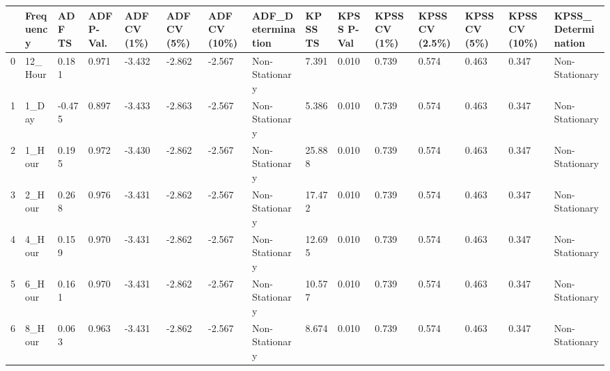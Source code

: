 \begin{tabular}{lllllllllllllll}
\toprule
 & Frequency & ADF TS & ADF P-Val. & ADF CV (1\%) & ADF CV (5\%) & ADF CV (10\%) & ADF_Determination & KPSS TS & KPSS P-Val & KPSS CV (1\%) & KPSS CV (2.5\%) & KPSS CV (5\%) & KPSS CV (10\%) & KPSS_Determination \\
\midrule
0 & 12_Hour & 0.181 & 0.971 & -3.432 & -2.862 & -2.567 & Non-Stationary & 7.391 & 0.010 & 0.739 & 0.574 & 0.463 & 0.347 & Non-Stationary \\
1 & 1_Day & -0.475 & 0.897 & -3.433 & -2.863 & -2.567 & Non-Stationary & 5.386 & 0.010 & 0.739 & 0.574 & 0.463 & 0.347 & Non-Stationary \\
2 & 1_Hour & 0.195 & 0.972 & -3.430 & -2.862 & -2.567 & Non-Stationary & 25.888 & 0.010 & 0.739 & 0.574 & 0.463 & 0.347 & Non-Stationary \\
3 & 2_Hour & 0.268 & 0.976 & -3.431 & -2.862 & -2.567 & Non-Stationary & 17.472 & 0.010 & 0.739 & 0.574 & 0.463 & 0.347 & Non-Stationary \\
4 & 4_Hour & 0.159 & 0.970 & -3.431 & -2.862 & -2.567 & Non-Stationary & 12.695 & 0.010 & 0.739 & 0.574 & 0.463 & 0.347 & Non-Stationary \\
5 & 6_Hour & 0.161 & 0.970 & -3.431 & -2.862 & -2.567 & Non-Stationary & 10.577 & 0.010 & 0.739 & 0.574 & 0.463 & 0.347 & Non-Stationary \\
6 & 8_Hour & 0.063 & 0.963 & -3.431 & -2.862 & -2.567 & Non-Stationary & 8.674 & 0.010 & 0.739 & 0.574 & 0.463 & 0.347 & Non-Stationary \\
\bottomrule
\end{tabular}
